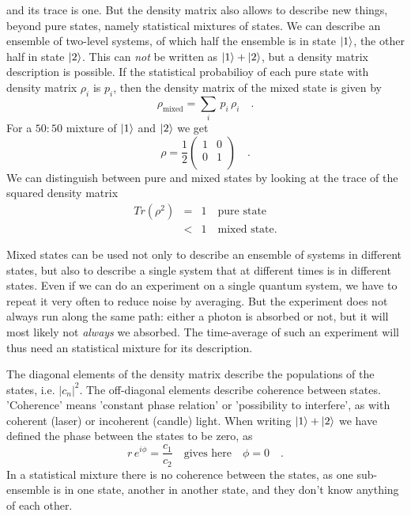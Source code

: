 and its trace is one. But the density matrix also allows to describe new things, beyond pure states, namely statistical mixtures of states. We can describe an ensemble of two-level systems, of which half the ensemble is in state $\ket{1}$, the other half in state $\ket{2}$. This can \emph{not} be written as 
$\ket{1} + \ket{2} $, but a density matrix description is possible. If the statistical probabilioy of each pure state with density matrix $\rho_i$ is $p_i$, then the density matrix of the mixed state is given by
\begin{equation}
\rho_\text{mixed} = \sum_i \, p_i \, \rho_i \quad .
\end{equation}
For a $50:50$ mixture of $\ket{1}$ and  $\ket{2}$ we get
\begin{equation}
 \rho = \frac{1}{2} \begin{pmatrix}
 1 & 0 \\ 0 & 1 \\
 \end{pmatrix} \quad .
\end{equation}
We can distinguish between pure and mixed states by looking at the trace of the squared density matrix
\begin{eqnarray}
 Tr (\rho^2) & = & 1 \quad \text{pure state} \\
 				& < & 1 \quad \text{mixed state.}
\end{eqnarray}

Mixed states can be  used not only to describe an ensemble of systems in different states, but also to describe a single system that at different times is in different states. Even if we can do an experiment on  a single quantum system, we have to repeat it very often to reduce noise by averaging. But the experiment does not always run along the same path: either a photon is absorbed or not, but it will most likely not \emph{always}  we absorbed. The time-average of such an experiment will thus need  an statistical mixture for its description.


The diagonal elements of the density matrix describe the populations of the states, i.e. $|c_n|^2$. The off-diagonal elements describe coherence between states. 'Coherence' means 'constant phase relation' or 'possibility to interfere', as with coherent (laser) or incoherent (candle) light. When writing $\ket{1} + \ket{2} $ we have defined the phase between the states to be zero, as  
\begin{equation}
r \, e^{i \phi} = \frac{c_1}{c_2} \quad \text{gives here} \quad \phi = 0 \quad .
\end{equation}
In a statistical mixture there is no coherence between the states, as one sub-ensemble is in one state, another in another state, and they don't know anything of each other.





